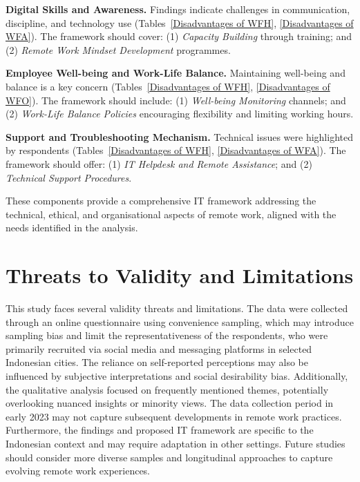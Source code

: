 \documentclass[a4paper, conference]{IEEEtran}
\begin{document}
\textbf{Digital Skills and Awareness.}
Findings indicate challenges in communication, discipline, and technology use (Tables~\ref{Disadvantages of WFH}, \ref{Disadvantages of WFA}). The framework should cover: (1) \textit{Capacity Building} through training; and (2) \textit{Remote Work Mindset Development} programmes.

\textbf{Employee Well-being and Work-Life Balance.}
Maintaining well-being and balance is a key concern (Tables~\ref{Disadvantages of WFH}, \ref{Disadvantages of WFO}). The framework should include: (1) \textit{Well-being Monitoring} channels; and (2) \textit{Work-Life Balance Policies} encouraging flexibility and limiting working hours.

\textbf{Support and Troubleshooting Mechanism.}
Technical issues were highlighted by respondents (Tables~\ref{Disadvantages of WFH}, \ref{Disadvantages of WFA}). The framework should offer: (1) \textit{IT Helpdesk and Remote Assistance}; and (2) \textit{Technical Support Procedures}.


These components provide a comprehensive IT framework addressing the technical, ethical, and organisational aspects of remote work, aligned with the needs identified in the analysis.


\section{Threats to Validity and Limitations}

This study faces several validity threats and limitations. The data were collected through an online questionnaire using convenience sampling, which may introduce sampling bias and limit the representativeness of the respondents, who were primarily recruited via social media and messaging platforms in selected Indonesian cities. The reliance on self-reported perceptions may also be influenced by subjective interpretations and social desirability bias. Additionally, the qualitative analysis focused on frequently mentioned themes, potentially overlooking nuanced insights or minority views. The data collection period in early 2023 may not capture subsequent developments in remote work practices. Furthermore, the findings and proposed IT framework are specific to the Indonesian context and may require adaptation in other settings. Future studies should consider more diverse samples and longitudinal approaches to capture evolving remote work experiences.
\end{document}
